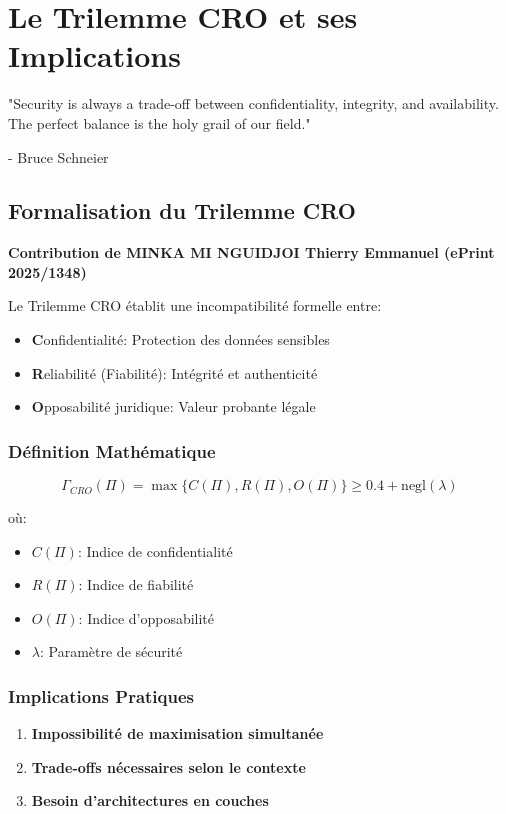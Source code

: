\chapter{Le Trilemme CRO et ses Implications}
\epigraph{"Security is always a trade-off between confidentiality, integrity, and availability. The perfect balance is the holy grail of our field."}{- Bruce Schneier}
\section{Formalisation du Trilemme CRO}
\textbf{Contribution de MINKA MI NGUIDJOI Thierry Emmanuel (ePrint 2025/1348)}

Le Trilemme CRO établit une incompatibilité formelle entre:

\begin{itemize}
\item \textbf{C}onfidentialité: Protection des données sensibles
\item \textbf{R}eliabilité (Fiabilité): Intégrité et authenticité
\item \textbf{O}pposabilité juridique: Valeur probante légale
\end{itemize}

\subsection{Définition Mathématique}
\[
\Gamma_{CRO}(\Pi) = \max\{C(\Pi), R(\Pi), O(\Pi)\} \geq 0.4 + \text{negl}(\lambda)
\]

où:
\begin{itemize}
\item $C(\Pi)$: Indice de confidentialité
\item $R(\Pi)$: Indice de fiabilité
\item $O(\Pi)$: Indice d'opposabilité
\item $\lambda$: Paramètre de sécurité
\end{itemize}

\subsection{Implications Pratiques}
\begin{enumerate}
\item \textbf{Impossibilité de maximisation simultanée}
\item \textbf{Trade-offs nécessaires selon le contexte}
\item \textbf{Besoin d'architectures en couches}
\end{enumerate}

